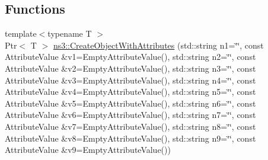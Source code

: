 \subsection*{Functions}
\begin{DoxyCompactItemize}
\item 
{\footnotesize template$<$typename T $>$ }\\Ptr$<$ T $>$ \hyperlink{group__object_ga4b90e30f6cf96f37d4a646f3fc62cd06}{ns3\+::\+Create\+Object\+With\+Attributes} (std\+::string n1=\char`\"{}\char`\"{}, const Attribute\+Value \&v1=Empty\+Attribute\+Value(), std\+::string n2=\char`\"{}\char`\"{}, const Attribute\+Value \&v2=Empty\+Attribute\+Value(), std\+::string n3=\char`\"{}\char`\"{}, const Attribute\+Value \&v3=Empty\+Attribute\+Value(), std\+::string n4=\char`\"{}\char`\"{}, const Attribute\+Value \&v4=Empty\+Attribute\+Value(), std\+::string n5=\char`\"{}\char`\"{}, const Attribute\+Value \&v5=Empty\+Attribute\+Value(), std\+::string n6=\char`\"{}\char`\"{}, const Attribute\+Value \&v6=Empty\+Attribute\+Value(), std\+::string n7=\char`\"{}\char`\"{}, const Attribute\+Value \&v7=Empty\+Attribute\+Value(), std\+::string n8=\char`\"{}\char`\"{}, const Attribute\+Value \&v8=Empty\+Attribute\+Value(), std\+::string n9=\char`\"{}\char`\"{}, const Attribute\+Value \&v9=Empty\+Attribute\+Value())
\end{DoxyCompactItemize}
